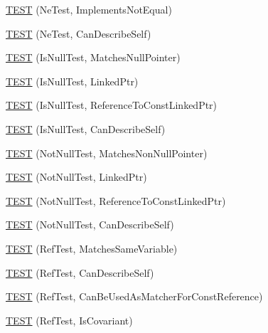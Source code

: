 \begin{DoxyCompactItemize}
\item 
\hyperlink{namespacetesting_1_1gmock__matchers__test_a7319f919e57cf349f733bbdb56177daf}{T\+E\+ST} (Ne\+Test, Implements\+Not\+Equal)
\item 
\hyperlink{namespacetesting_1_1gmock__matchers__test_a8a743510a5256803d75c2d7735ec515a}{T\+E\+ST} (Ne\+Test, Can\+Describe\+Self)
\item 
\hyperlink{namespacetesting_1_1gmock__matchers__test_ae1c2971c161e051bf52b86b62c51bb95}{T\+E\+ST} (Is\+Null\+Test, Matches\+Null\+Pointer)
\item 
\hyperlink{namespacetesting_1_1gmock__matchers__test_a0b1655e1640b7da6e1e7cc35074d9274}{T\+E\+ST} (Is\+Null\+Test, Linked\+Ptr)
\item 
\hyperlink{namespacetesting_1_1gmock__matchers__test_afaaf0776096c0ad62de8236ab1b774d7}{T\+E\+ST} (Is\+Null\+Test, Reference\+To\+Const\+Linked\+Ptr)
\item 
\hyperlink{namespacetesting_1_1gmock__matchers__test_a5ba91e0b79fcc0b17b1c1e373e741c38}{T\+E\+ST} (Is\+Null\+Test, Can\+Describe\+Self)
\item 
\hyperlink{namespacetesting_1_1gmock__matchers__test_a694ea33511eab7822b88d8e74b388534}{T\+E\+ST} (Not\+Null\+Test, Matches\+Non\+Null\+Pointer)
\item 
\hyperlink{namespacetesting_1_1gmock__matchers__test_aec956599ef91df968fec972247c7a28a}{T\+E\+ST} (Not\+Null\+Test, Linked\+Ptr)
\item 
\hyperlink{namespacetesting_1_1gmock__matchers__test_a9e9560feb52f60475f653c15cc7466aa}{T\+E\+ST} (Not\+Null\+Test, Reference\+To\+Const\+Linked\+Ptr)
\item 
\hyperlink{namespacetesting_1_1gmock__matchers__test_a68da7653e6a480c60a3a03fe8afb20fc}{T\+E\+ST} (Not\+Null\+Test, Can\+Describe\+Self)
\item 
\hyperlink{namespacetesting_1_1gmock__matchers__test_a199983108927dadee9bd2e03ddd6057d}{T\+E\+ST} (Ref\+Test, Matches\+Same\+Variable)
\item 
\hyperlink{namespacetesting_1_1gmock__matchers__test_ad8fc5a82cbb4b5b8147798be06d7059b}{T\+E\+ST} (Ref\+Test, Can\+Describe\+Self)
\item 
\hyperlink{namespacetesting_1_1gmock__matchers__test_af1e64d057f2c46cc17f1c96a075cde6b}{T\+E\+ST} (Ref\+Test, Can\+Be\+Used\+As\+Matcher\+For\+Const\+Reference)
\item 
\hyperlink{namespacetesting_1_1gmock__matchers__test_a03b45cf0f65f33208ac378b8603ff67a}{T\+E\+ST} (Ref\+Test, Is\+Covariant)
\item 

\end{DoxyCompactItemize}
